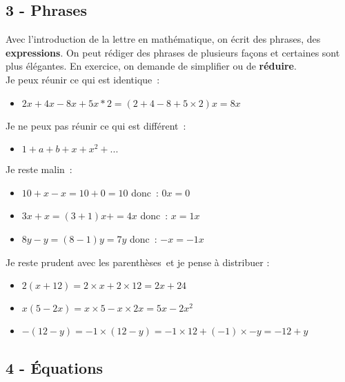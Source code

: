 \documentclass[11pt]{article}
\begin{document}
\newpage

\subsection*{3 - Phrases}

Avec l’introduction de la lettre en mathématique, on écrit des phrases, des \textbf{expressions}. On peut rédiger des phrases de plusieurs façons et certaines sont plus élégantes. En exercice, on demande de simplifier ou de \textbf{réduire}.\\

Je peux réunir ce qui est identique : 
\begin{itemize}
  \item $2x + 4x - 8x + 5x * 2 =  (2+4-8+5 \times 2)x = 8x$
\end{itemize} Je ne peux pas réunir ce qui est différent :
\begin{itemize}
  \item $1 + a + b + x + x^2 + ...$
\end{itemize} 

Je reste malin : 

\begin{itemize}
  \item $10 + x - x = 10 + 0 = 10$   donc : $0x = 0$
  \item $3x + x = (3+1)x + = 4x$ donc : $x=1x$
  \item $8y - y = (8-1)y = 7y$ donc : $-x = -1x$
\end{itemize}

 Je reste prudent avec les parenthèses et je pense à distribuer : 

 \begin{itemize}
  \item $2(x+12) = 2 \times x+2 \times12 = 2x + 24$
  \item $x(5 - 2x) = x \times 5 - x  \times 2x = 5x  - 2x^2$
  \item $-(12 - y) = -1 \times (12-y) = -1 \times 12 + (-1) \times -y = -12 + y$
\end{itemize} 

\subsection*{4 - Équations}
\end{document}

